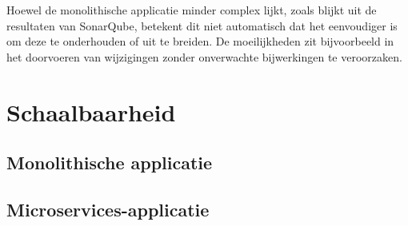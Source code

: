 Hoewel de monolithische applicatie minder complex lijkt, zoals blijkt uit de resultaten van SonarQube, betekent dit niet automatisch dat het eenvoudiger is om deze te onderhouden of uit te breiden. De moeilijkheden zit bijvoorbeeld in het doorvoeren van wijzigingen zonder onverwachte bijwerkingen te veroorzaken.

\section{Schaalbaarheid}


\subsection{Monolithische applicatie}



\subsection{Microservices-applicatie}



